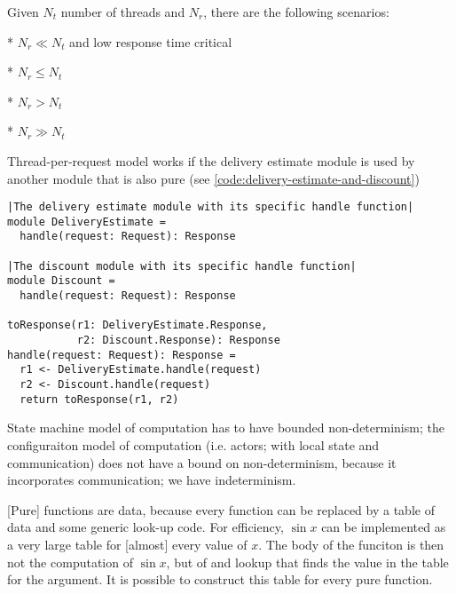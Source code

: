 \documentclass[10 pt, twocolumn]{article}
\begin{document}
Given $N_{t}$ number of threads and $N_{r}$, there are the following scenarios:

* $N_{r} \ll N_{t}$ and low response time critical

* $N_{r} \le N_{t}$ 

* $N_{r} > N_{t}$

* $N_{r} \gg N_{t}$

Thread-per-request model works if the delivery estimate module is used by another module that is also pure (see \autoref{code:delivery-estimate-and-discount})

\begin{lstlisting}[caption={Delivery and discount}, label={code:delivery-estimate-and-discount}, language=Pseudo, escapechar=|]
|The delivery estimate module with its specific handle function|
module DeliveryEstimate =
  handle(request: Request): Response

|The discount module with its specific handle function|
module Discount =
  handle(request: Request): Response

toResponse(r1: DeliveryEstimate.Response,
           r2: Discount.Response): Response
handle(request: Request): Response = 
  r1 <- DeliveryEstimate.handle(request)
  r2 <- Discount.handle(request)
  return toResponse(r1, r2)

\end{lstlisting}


State machine model of computation has to have bounded non-determinism; the configuraiton model of computation (i.e. actors; with local state and communication) does not have a bound on non-determinism, because it incorporates communication; we have indeterminism.

[Pure] functions are data, because every function can be replaced by a table of data and some generic look-up code. For efficiency, $\sin x$ can be implemented as a very large table for [almost] every value of $x$. The body of the funciton is then not the computation of $\sin x$, but of  and lookup that finds the value in the table for the argument. It is possible to construct this table for every pure function.
\end{document}
